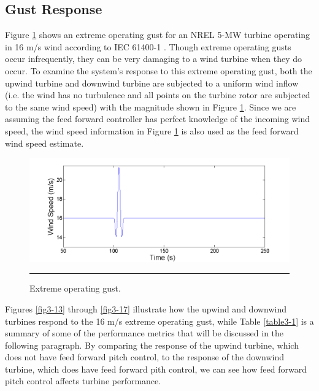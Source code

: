 \subsection{Gust Response}\label{section3-4-1}

Figure \ref{fig3-12} shows an extreme operating gust for an NREL 5-MW turbine operating in 16 m/s wind according to IEC 61400-1 \cite{IEC2005}. Though extreme operating gusts occur infrequently, they can be very damaging to a wind turbine when they do occur. To examine the system's response to this extreme operating gust, both the upwind turbine and downwind turbine are subjected to a uniform wind inflow (i.e. the wind has no turbulence and all points on the turbine rotor are subjected to the same wind speed) with the magnitude shown in Figure \ref{fig3-12}. Since we are assuming the feed forward controller has perfect knowledge of the incoming wind speed, the wind speed information in Figure \ref{fig3-12} is also used as the feed forward wind speed estimate.


\begin{figure}[htbp]
	\centering
		\includegraphics[trim = {1cm 0 2cm 0}, clip, width = \linewidth]{Figures/ch3Figures/fig3-12.png}
		\rule{35em}{0.5pt}
	\caption{Extreme operating gust.}
	\label{fig3-12}
\end{figure}


Figures \ref{fig3-13} through \ref{fig3-17} illustrate how the upwind and downwind turbines respond to the 16 m/s extreme operating gust, while Table \ref{table3-1} is a summary of some of the performance metrics that will be discussed in the following paragraph. By comparing the response of the upwind turbine, which does not have feed forward pitch control, to the response of the downwind turbine, which does have feed forward pith control, we can see how feed forward pitch control affects turbine performance.

